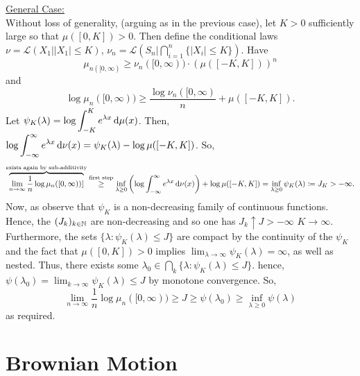 \documentclass{article}
\begin{document}
\underline{General Case:}\\ 

Without loss of generality, (arguing as in the previous case), let $ K>0$ sufficiently large so that $ \mu([0, K])>0$. Then define the conditional laws $ \nu = \mathcal{L}(X_{1}| |X_{1}|\leq K)$, $ \nu_{n} = \mathcal{L}\left(S_{n}\Big| \displaystyle\bigcap^n_{i = 1} \{|X_{i}|\leq K\}\right)$. Have 
\[
	\mu_{n([0,\infty)}\geq \nu_{n}([0,\infty))\cdot (\mu([-K,K]))^{n}
\]
and 
\[
\log \mu_{n}([0,\infty))\geq \frac{\log \nu_{n}([0,\infty)
}{n} +\mu([-K, K]).
\]
Let $ \psi_{K}(\lambda) = \log \displaystyle\int^{K}_{-K} e^{\lambda x}\operatorname{d}\!\mu(x)$. Then, 
$ \log \displaystyle\int^{\infty}_{-\infty}e^{\lambda x} \operatorname{d}\! \nu(x) = \psi_{K}(\lambda) -\log\mu([-K,K]) $. So, 
\[
	\overbrace{\lim_{n \to \infty}\frac{1}{n}\log\mu_{n}([0,\infty))]}^{ \text{exists again by sub-additivity}} \stackrel{\text{first step}}{\geq} \displaystyle\inf_{\lambda\geq 0} \left( \log \displaystyle\int^{\infty}_{-\infty}e^{\lambda x} \operatorname{d}\! \nu(x)   \right)+ \log\mu([-K,K]) = \displaystyle\inf_{\lambda \geq 0}\psi_{K}(\lambda) \coloneqq J_{K}>-\infty.\\ 
\]
Now, as observe that $ \psi_{K}$ is a non-decreasing family of continuous functions. Hence, the $(J_{k})_{k\in \mathbb{N}}$ are non-decreasing and so one has $ J_{k}\uparrow J>-\infty$ $ K\to \infty$. Furthermore, the sets $ \{\lambda: \psi_{K}(\lambda)\leq J\}$ are compact by the continuity of the $ \psi_{K}$and the fact that $ \mu([0,K])>0$ implies $ \displaystyle\lim_{\lambda  \to \infty}\psi_{K}(\lambda) = \infty $, as well as nested. Thus, there exists some $ \lambda_{0}\in \displaystyle\bigcap_{k} \{\lambda: \psi_{K}(\lambda)\leq J\}$. hence, $ \psi(\lambda_{0}) = \displaystyle\lim_{k\to\infty}\psi_{K}(\lambda)\leq J $ by monotone convergence. So, 
	\[
\lim_{n \to \infty}\frac{1}{n}\log\mu_{n}([0,\infty)) \geq J\geq \psi(\lambda_{0})\geq \displaystyle\inf_{\lambda\geq 0 }\psi(\lambda)
	\] 
as required.\\

\section{Brownian Motion}\label{Brownian motion}
\begin{boxdef}[]\label{def: }

\end{boxdef}
\end{document}
